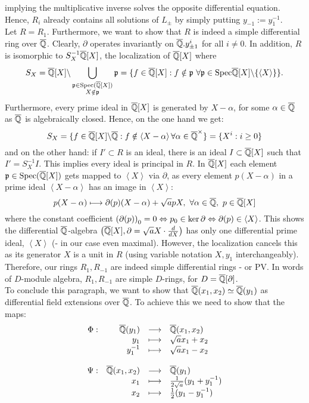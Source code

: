 implying the multiplicative inverse solves the opposite differential equation. Hence, $R_i$ already contains all solutions of $L_\pm$ by simply putting $y_{-1} := y_1^{-1}$.\\
\indent Let $R = R_1$. Furthermore, we want to show that $R$ is indeed a simple differential ring over $\currfield$. Clearly, $\partial$ operates invariantly on $\currfield.y_{\pm 1}^i$ for all $i \neq 0$. In addition, $R$ is isomorphic to $S_{X}^{-1}\currfield[X]$, the localization of $\currfield[X]$ where
$$S_X = \currfield[X] \bsl \bigcup_{\substack{\mathfrak{p} \in \trm{Spec}(\currfield[X])\\X \notin \mathfrak{p}}} \mathfrak{p} = \{f \in \currfield[X] : f \notin \idealp\ \forall \idealp \in \trm{Spec} \currfield[X] \bsl \{\left<X\right>\}\}.$$ Furthermore, every prime ideal in $\currfield[X]$ is generated by $X - \alpha$, for some $\alpha \in \currfield$ as $\currfield$ is algebraically closed. Hence, on the one hand we get:
$$S_X = \{f \in \currfield[X]\bsl \currfield : f \notin \left<X - \alpha\right> \forall \alpha \in \currfield^\times\} = \{X^i : i \geq 0\}$$
and on the other hand: if $I' \subset R$ is an ideal, there is an ideal  $I \subset \currfield[X]$ such that $I' = S_{X}^{-1} I$. This implies every ideal is principal in $R$. In $\currfield[X]$ each element $\mathfrak{p} \in \trm{Spec}(\currfield[X])$ gets mapped to $\left<X\right>$ via $\partial$, as every element $p (X - \alpha)$ in a prime ideal $\left<X - \alpha\right>$ has an image in $\left<X\right>$:
$$p (X - \alpha) \longmapsto \partial(p) (X - \alpha) + \sqrt{a} p X,\ \forall \alpha \in \currfield,\ p \in \currfield[X]$$
where the constant coefficient $\left(\partial(p)\right)_0 = 0 \LRA p_0 \in \ker \partial \LRA \partial(p) \in \left<X\right>$. This shows the differential $\currfield$-algebra $\left(\currfield[X], \partial = \sqrt{a} X \cdot \frac{d}{d X}\right)$ has only one differential prime ideal, $\left<X\right>$ (- in our case even maximal). However, the localization cancels this as its generator $X$ is a unit in $R$ (using variable notation $X, y_1$ interchangeably). Therefore, our rings $R_1, R_{-1}$ are indeed simple differential rings - or PV. In words of $D$-module algebra, $R_1, R_{-1}$ are simple $D$-rings, for $D = \currfield[\partial]$.\\
\indent To conclude this paragraph, we want to show that $\currfield(x_1,x_2) \simeq \currfield(y_1)$ as differential field extensions over $\currfield$. To achieve this we need to show that the maps:
$$\bao{rrcl}
\Phi : & \currfield(y_1) &\longrightarrow& \currfield(x_1,x_2)\\
& y_1 &\longmapsto & \sqrt{a} x_1 + x_2\\
& y_1^{-1}&\longmapsto & \sqrt{a} x_1 - x_2\\
&&&\\
\Psi : &\currfield(x_1,x_2) &\longrightarrow& \currfield(y_1)\\
& x_1 &\longmapsto& \frac{1}{2 \sqrt{a}} (y_1 + y_1^{-1})\\
& x_2 &\longmapsto& \frac{1}{2} (y_1 - y_1^{-1})\\
\ea$$\label{PVisomorph}

